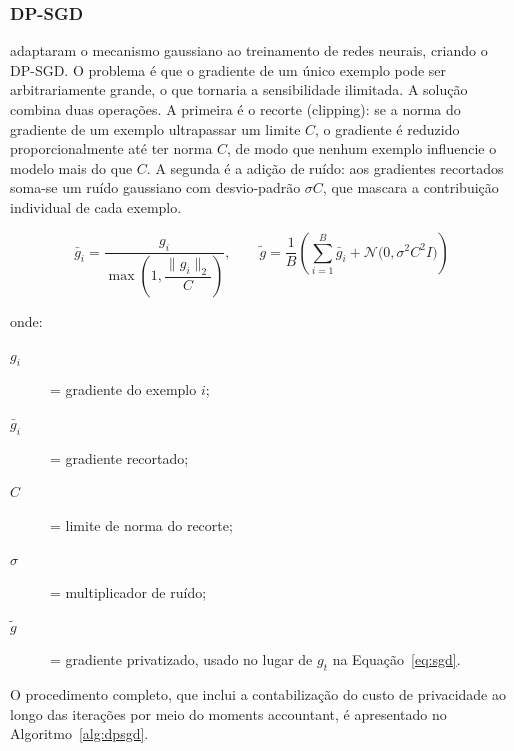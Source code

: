 \subsubsection{DP-SGD}

 adaptaram o mecanismo gaussiano ao treinamento de redes neurais, criando o DP-SGD. O problema é que o gradiente de um único exemplo pode ser arbitrariamente grande, o que tornaria a sensibilidade ilimitada. A solução combina duas operações. A primeira é o recorte (clipping): se a norma do gradiente de um exemplo ultrapassar um limite $C$, o gradiente é reduzido proporcionalmente até ter norma $C$, de modo que nenhum exemplo influencie o modelo mais do que $C$. A segunda é a adição de ruído: aos gradientes recortados soma-se um ruído gaussiano com desvio-padrão $\sigma C$, que mascara a contribuição individual de cada exemplo.

\begin{equation} \label{eq:dpsgd}
\bar{g}_i = \frac{g_i}{\max\!\left(1, \dfrac{\| g_i \|_2}{C}\right)}, \qquad \tilde{g} = \frac{1}{B} \left( \sum_{i=1}^{B} \bar{g}_i + \mathcal{N}\big(0, \sigma^{2} C^{2} I\big) \right)
\end{equation}

\noindent onde:
\begin{description}
  \item[$g_i$] = gradiente do exemplo $i$;
  \item[$\bar{g}_i$] = gradiente recortado;
  \item[$C$] = limite de norma do recorte;
  \item[$\sigma$] = multiplicador de ruído;
  \item[$\tilde{g}$] = gradiente privatizado, usado no lugar de $g_t$ na Equação~\ref{eq:sgd}.
\end{description}

O procedimento completo, que inclui a contabilização do custo de privacidade ao longo das iterações por meio do moments accountant, é apresentado no Algoritmo~\ref{alg:dpsgd}.


